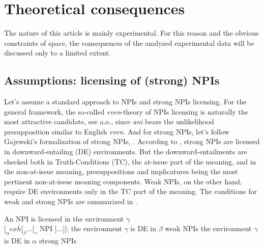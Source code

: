 \section{Theoretical consequences}\label{sec:theoretical_consequences}

The nature of this article is mainly experimental. For this reason and the obvious constraints of space, the consequences of the analyzed experimental data will be discussed only to a limited extent. 

\subsection{Assumptions: licensing of (strong)
NPIs}\label{sec:assumptions-licensing-of-strong-npis}

Let's assume a standard approach to NPIs and strong NPIs licensing. For the general framework, the so-called \textit{even}-theory of NPIs licensing is naturally the most attractive candidate, see \citet{krifka1995semantics,lahiri1998focus,crnivc2014non} a.o., since \textit{ani} bears the unlikelihood presupposition similar to English \textit{even}. And for strong NPIs, let's follow Gajewski's formalization of strong NPIs,  \citet{gajewski2011licensing}. According to \citet{gajewski2011licensing}, strong NPIs are licensed in downward-entailing (DE) environments. But the downward-entailments are checked both in Truth-Conditions (TC), the at-issue part of the meaning, and in the non-at-issue meaning, presuppositions and implicatures being the most pertinent non-at-issue meaning components. Weak NPIs, on the other hand, require DE environments only in the TC part of the meaning. The conditions for weak and strong NPIs are summarized in .

\ea\label{ex:9} An NPI is licensed in the environment \(\gamma\)\\
\([_\alpha exh [_\beta \ldots [_\gamma\) NPI \(] \ldots ]]\): 
\ea the environment \(\gamma\) is DE in \(\beta\) \hfill weak NPIs 
\ex the environment \(\gamma\) is DE in \(\alpha\) \hfill strong NPIs\z\z


